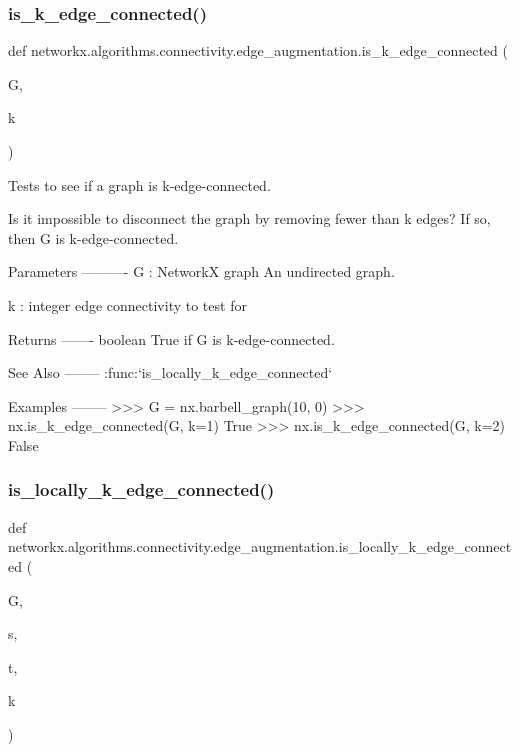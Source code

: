 \subsubsection{\texorpdfstring{is\+\_\+k\+\_\+edge\+\_\+connected()}{is\_k\_edge\_connected()}}
{\footnotesize\ttfamily def networkx.\+algorithms.\+connectivity.\+edge\+\_\+augmentation.\+is\+\_\+k\+\_\+edge\+\_\+connected (\begin{DoxyParamCaption}\item[{}]{G,  }\item[{}]{k }\end{DoxyParamCaption})}

\begin{DoxyVerb}Tests to see if a graph is k-edge-connected.

Is it impossible to disconnect the graph by removing fewer than k edges?
If so, then G is k-edge-connected.

Parameters
----------
G : NetworkX graph
   An undirected graph.

k : integer
    edge connectivity to test for

Returns
-------
boolean
    True if G is k-edge-connected.

See Also
--------
:func:`is_locally_k_edge_connected`

Examples
--------
>>> G = nx.barbell_graph(10, 0)
>>> nx.is_k_edge_connected(G, k=1)
True
>>> nx.is_k_edge_connected(G, k=2)
False
\end{DoxyVerb}
 \mbox{\label{namespacenetworkx_1_1algorithms_1_1connectivity_1_1edge__augmentation_a0f587abc03abd9c47c5a343e89138e52}} 
\subsubsection{\texorpdfstring{is\+\_\+locally\+\_\+k\+\_\+edge\+\_\+connected()}{is\_locally\_k\_edge\_connected()}}
{\footnotesize\ttfamily def networkx.\+algorithms.\+connectivity.\+edge\+\_\+augmentation.\+is\+\_\+locally\+\_\+k\+\_\+edge\+\_\+connected (\begin{DoxyParamCaption}\item[{}]{G,  }\item[{}]{s,  }\item[{}]{t,  }\item[{}]{k }\end{DoxyParamCaption})}

